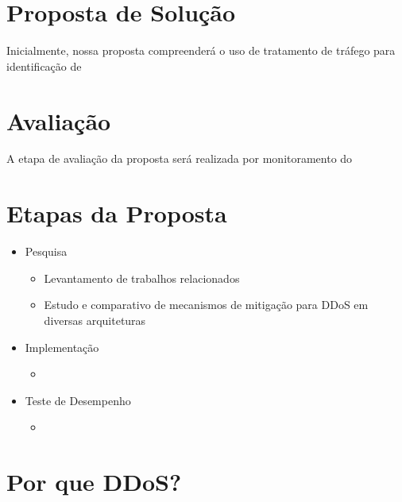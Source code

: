 \documentclass[a4paper, 11pt]{article}
\begin{document}
\section{Proposta de Solu\c{c}\~{a}o}
Inicialmente, nossa proposta compreender\'a o uso de tratamento de tr\'afego
para identifica\c{c}\~{a}o de 

\section{Avalia\c{c}\~{a}o}
A etapa de avalia\c{c}\~{a}o da proposta ser\'a realizada por monitoramento do 

\section{Etapas da Proposta}
\begin{itemize}
 \item Pesquisa
  \begin{itemize}
  \item Levantamento de trabalhos relacionados
  \item Estudo e comparativo de  mecanismos de mitiga\c{c}\~{a}o para
DDoS em diversas arquiteturas 
  \end{itemize}
 \item Implementa\c{c}\~{a}o
  \begin{itemize}
    \item %
  \end{itemize}
 \item Teste de Desempenho 
  \begin{itemize}
    \item %
  \end{itemize}
\end{itemize}

\section{Por que DDoS?}



\newpage


\end{document}
